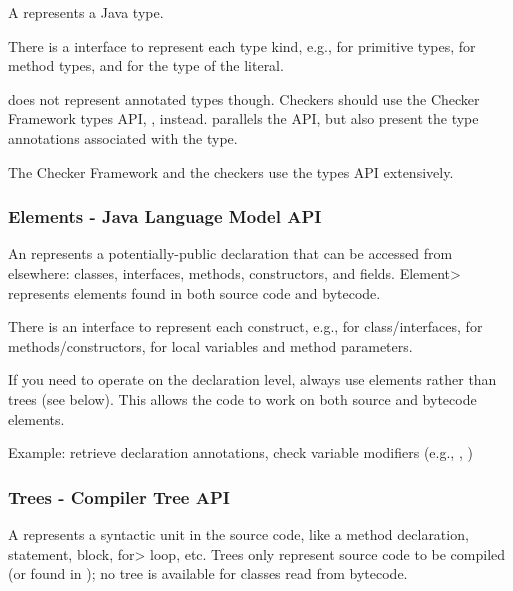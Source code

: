 A  represents a Java type.

There is a  interface to represent each type kind,
e.g.,  for primitive types, 
for method types, and  for the type of the  literal.

 does not represent annotated types though.  Checkers
should use the Checker Framework types API,
, instead.  
parallels the  API, but also present the type annotations
associated with the type.

The Checker Framework and the checkers use the types API extensively.


\subsubsection{Elements - Java Language Model API\label{javac-elements}}

An  represents a potentially-public
declaration that can be accessed from elsewhere:  classes, interfaces, methods, constructors, and
fields.  \<Element> represents elements found in both source
code and bytecode.

There is an  interface to represent each construct, e.g.,
 for class/interfaces,  for
methods/constructors,  for local variables and
method parameters.

If you need to operate on the declaration level, always use elements rather
than trees
(see below).  This allows the code to work on
both source and bytecode elements.

Example: retrieve declaration annotations, check variable
modifiers (e.g., , )


\subsubsection{Trees - Compiler Tree API\label{javac-trees}}

A  represents a syntactic unit in the source code,
like a method declaration, statement, block, \<for> loop, etc. Trees only
represent source code to be compiled (or found in );
no tree is available for classes read from bytecode.

